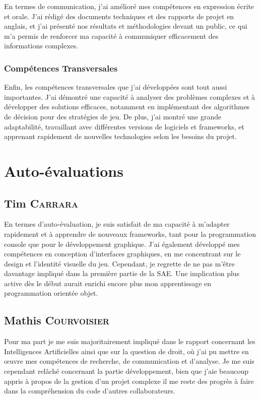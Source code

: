En termes de communication, j'ai amélioré mes compétences en expression écrite et orale. J'ai rédigé des documents techniques et des rapports de projet en anglais, et j'ai présenté nos résultats et méthodologies devant un public, ce qui m'a permis de renforcer ma capacité à communiquer efficacement des informations complexes.

\subsubsection*{Compétences Transversales}

Enfin, les compétences transversales que j'ai développées sont tout aussi importantes. J'ai démontré une capacité à analyser des problèmes complexes et à développer des solutions efficaces, notamment en implémentant des algorithmes de décision pour des stratégies de jeu. De plus, j'ai montré une grande adaptabilité, travaillant avec différentes versions de logiciels et frameworks, et apprenant rapidement de nouvelles technologies selon les besoins du projet.


\section{Auto-évaluations}

\subsection*{Tim \textsc{Carrara}}

En termes d'auto-évaluation, je suis satisfait de ma capacité à m'adapter rapidement et à apprendre de nouveaux frameworks, tant pour la programmation console que pour le développement graphique. J'ai également développé mes compétences en conception d'interfaces graphiques, en me concentrant sur le design et l'identité visuelle du jeu. Cependant, je regrette de ne pas m'être davantage impliqué dans la première partie de la SAE. Une implication plus active dès le début aurait enrichi encore plus mon apprentissage en programmation orientée objet.

\subsection*{Mathis \textsc{Courvoisier}}

Pour ma part je me suis majoritairement impliqué dans le rapport concernant les Intelligences Artificielles ainsi que sur la question de droit, où j'ai pu mettre en œuvre mes compétences de recherche, de communication et d'analyse. Je me suis cependant relâché concernant la partie développement, bien que j'aie beaucoup appris à propos de la gestion d'un projet complexe il me reste des progrès à faire dans la compréhension du code d'autres collaborateurs.

